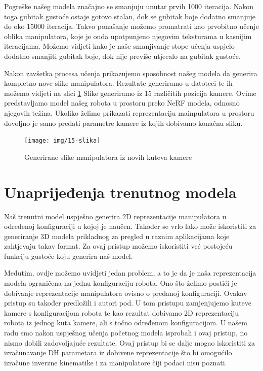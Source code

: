 \documentclass[times, utf8, diplomskirad]{fer}
\begin{document}
Pogreške našeg modela značajno se smanjuju unutar prvih 1000 iteracija.
Nakon toga gubitak gustoće ostaje gotovo stalan, dok se gubitak boje dodatno smanjuje do oko 15000 iteracija.
Takvo ponašanje možemo promatrati kao prvobitno učenje oblika manipulatora, koje je onda upotpunjeno njegovim teksturama u kasnijim iteracijama.
Možemo vidjeti kako je naše smanjivanje stope učenja uspjelo dodatno smanjiti gubitak boje, dok nije previše utjecalo na gubitak gustoće.

Nakon zavšetka procesa učenja prikazujemo sposobnost našeg modela da generira kompletno nove slike manipulatora.
Rezultate generiramo u datoteci  te ih možemo vidjeti na slici \ref{fig:final-slike-3d}
Slike generiramo iz 15 različitih pozicija kamere.
Ovime predstavljamo model našeg robota u prostoru preko NeRF modela, odnosno njegovih težina.
Ukoliko želimo prikazati reprezentaciju mainpulatora u prostoru dovoljno je samo predati parametre kamere iz kojih dobivamo konačnu sliku.

\begin{figure}[H]
    \centering
    \texttt{[image: img/15-slika]}
    \caption{Generirane slike manipulatora iz novih kuteva kamere}
    \label{fig:final-slike-3d}
\end{figure}

\section{Unaprijeđenja trenutnog modela}
Naš trenutni model uspješno generira 2D reprezentacije manipulatora u određenoj konfiguraciji u kojoj je naučen.
Također se vrlo lako može iskoristiti za generiranje 3D modela prikladnog za pregled u raznim aplikacijama koje zahtjevaju takav format.
Za ovaj pristup možemo iskoristiti već postojeću funkciju gustoće koju generira naš model.

Međutim, ovdje možemo uvidjeti jedan problem, a to je da je naša reprezentacija modela ograničena na jednu konfiguraciju robota.
Ono što želimo postići je dobivanje reprezentacije manipulatora ovisno o predanoj konfiguraciji.
Ovakav pristup su također predložili i autori pod\cite{nerfSelfModelling}.
U tom pristupu zamjenjujemo kuteve kamere s konfiguracijom robota te kao rezultat dobivamo 2D reprezentaciju robota iz jednog kuta kamere, ali s točno određenom konfiguracijom.
U našem radu smo nakon uspješnog učenja početnog modela isprobali i ovaj pristup, no nismo dobili zadovoljajuće rezultate.
Ovaj pristup bi se dalje mogao iskoristiti za izračunavanje DH parametara iz dobivene reprezentacije što bi omogućilo izračune inverzne kinematike i za manipulatore čiji podaci nisu poznati.
\end{document}
